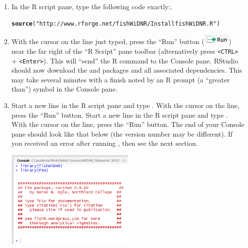 \documentclass{article}\usepackage[]{graphicx}\usepackage[]{color}
\makeatletter
\newcommand{\hlstr}[1]{\textcolor[rgb]{0.192,0.494,0.8}{#1}}%
\newcommand{\hlstd}[1]{\textcolor[rgb]{0.345,0.345,0.345}{#1}}%
\newcommand{\hlkwd}[1]{\textcolor[rgb]{0.737,0.353,0.396}{\textbf{#1}}}%
\newenvironment{kframe}{%
 \def\at@end@of@kframe{}%
 \ifinner\ifhmode%
  \def\at@end@of@kframe{\end{minipage}}%
  \begin{minipage}{\columnwidth}%
 \fi\fi%
 \def\FrameCommand##1{\hskip\@totalleftmargin \hskip-\fboxsep
 \colorbox{shadecolor}{##1}\hskip-\fboxsep
     \hskip-\linewidth \hskip-\@totalleftmargin \hskip\columnwidth}%
 \MakeFramed {\advance\hsize-\width
   \@totalleftmargin\z@ \linewidth\hsize
   \@setminipage}}%
 {\par\unskip\endMakeFramed%
 \at@end@of@kframe}
\newenvironment{knitrout}{}{} %
\makeatother
\begin{document}
\begin{enumerate}
  \item In the R script pane, type the following code exactly:.
\begin{knitrout}
\color{fgcolor}\begin{kframe}
\begin{alltt}
\hlkwd{source}\hlstd{(}\hlstr{"http://www.rforge.net/fishWiDNR/InstallfishWiDNR.R"}\hlstd{)}
\end{alltt}
\end{kframe}
\end{knitrout}
\vspace{12pt}
  \item With the cursor on the line just typed, press the ``Run'' button (\includegraphics[scale=0.8]{Figs/RStudio_Icon_Run.png}) near the far right of the ``R Script'' pane toolbar (alternatively press \verb+<CTRL>+ + \verb+<Enter>+).  This will ``send'' the R command to the Console pane.  RStudio should now download  the  and  packages and all associated dependencies.  This may take several minutes with a finish noted by an R prompt (a ``greater than'') symbol in the Console pane.
  \item Start a new line in the R script pane and type .  With the cursor on the line, press the ``Run'' button.  Start a new line in the R script pane and type .  With the cursor on the line, press the ``Run'' button.  The end of your Console pane should look like that below (the version number may be different).  If you received an error after running , then see the next section.
\begin{center}
  \includegraphics[width=2.5in]{Figs/RStudio_Prep_FSA.png}
\end{center}


\end{enumerate}
\end{document}
